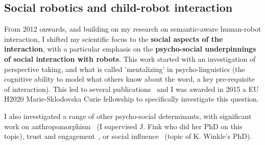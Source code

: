 \subsection{Social robotics and child-robot interaction}

From 2012 onwards, and building on my research on semantic-aware human-robot
interaction, I shifted my scientific focus to the \textbf{social aspects of the
interaction}, with a particular emphasis on the \textbf{psycho-social
underpinnings of social interaction with robots}. This work started with an
investigation of perspective taking, and what is called 'mentalizing' in
psycho-linguistics (the cognitive ability to model what others know about the
word, a key pre-requisite of interaction). This led to several
publications~\autocite{ros2010which, warnier2012when, lemaignan2015mutual} and I was
awarded in 2015 a EU H2020 Marie-Sklodovska Curie fellowship to specifically
investigate this question.

I also investigated a range of other psycho-social determinants, with
significant work on anthropomorphism~\autocite{lemaignan2014cognitive,fink2014which,
fink2014dynamics,lemaignan2015youre} (I supervised J. Fink who did her PhD on
this topic), trust and
engagement~\autocite{flook2019impact,lemaignan2015youre,fink2014which,wijnen2020performing},
or social influence~\autocite{irfan2018social, winkle2019effective} (topic of K.
Winkle's PhD).




\cite{karim2015review}



